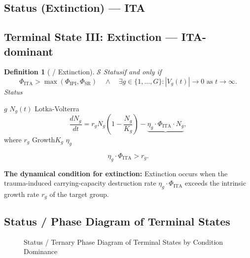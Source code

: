 \documentclass[11pt,a4paper]{article}
\newtheorem{definition}[theorem]{Definition}
\theoremstyle{remark}
\newcommand{\paren}[1]{\left(#1\right)}
\begin{document}
\subsection{Status (Extinction) — ITA }
\subsection{Terminal State III: Extinction — ITA-dominant}

\begin{definition}[ / Extinction]
\label{def:extinction}
 $\mathcal{S}$ \textbf{}Statusif and only if
\[
\Phi_{\text{ITA}} > \max(\Phi_{\text{IPI}}, \Phi_{\text{SR}}) \quad \land \quad
\exists g \in \{1,\ldots,G\} : |V_g(t)| \to 0 \text{ as } t \to \infty.
\]
Status


\end{definition}

\textbf{}
 $g$  $N_g(t)$ Lotka-Volterra 
\[
\frac{dN_g}{dt} = r_g N_g \paren{1 - \frac{N_g}{K_g}} - 
\underbrace{\eta_g \cdot \Phi_{\text{ITA}} \cdot N_g}_{\text{}},
\]
where $r_g$ Growth$K_g$ $\eta_g$ 

\[
\eta_g \cdot \Phi_{\text{ITA}} > r_g.
\]

\textbf{The dynamical condition for extinction:} Extinction occurs when the
trauma-induced carrying-capacity destruction rate $\eta_g \cdot \Phi_{\text{ITA}}$
exceeds the intrinsic growth rate $r_g$ of the target group.

\subsection{Status / Phase Diagram of Terminal States}

\begin{figure}[htbp]
\centering
\caption{Status / Ternary Phase Diagram of Terminal States by Condition Dominance}
\label{fig:ternary}
\end{figure}
\end{document}
